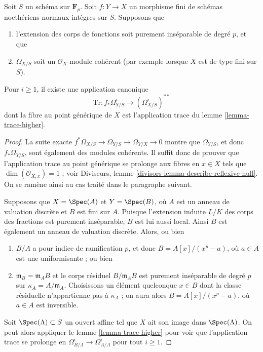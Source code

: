 \begin{lemma} \label{lemma-trace-extends} Soit $S$ un schéma sur $\mathbf{F}_p$. Soit $f : Y \to X$ un morphisme fini de schémas noethériens normaux intègres sur $S$. Supposons que \begin{enumerate} \item l'extension des corps de fonctions soit purement inséparable de degré $p$, et que \item $\Omega_{X/S}$ soit un $\mathcal{O}_X$-module cohérent (par exemple lorsque $X$ est de type fini sur $S$). \end{enumerate} Pour $i \geq 1$, il existe une application canonique $$
\text{Tr} : f_*\Omega^i_{Y/S} \longrightarrow (\Omega_{X/S}^i)^{**}
$$ dont la fibre au point générique de $X$ est l'application trace du lemme \ref{lemma-trace-higher}. \end{lemma}

\begin{proof} La suite exacte $f^*\Omega_{X/S} \to \Omega_{Y/S} \to \Omega_{Y/X} \to 0$ montre que $\Omega_{Y/S}$, et donc $f_*\Omega_{Y/S}$, sont également des modules cohérents. Il suffit donc de prouver que l'application trace au point générique se prolonge aux fibres en $x \in X$ tels que $\dim(\mathcal{O}_{X, x}) = 1$ ; voir Diviseurs, lemme \ref{divisors-lemma-describe-reflexive-hull}. On se ramène ainsi au cas traité dans le paragraphe suivant.

\medskip\noindent Supposons que $X = \Spec(A)$ et $Y = \Spec(B)$, où $A$ est un anneau de valuation discrète et $B$ est fini sur $A$. Puisque l'extension induite $L/K$ des corps des fractions est purement inséparable, $B$ est lui aussi local. Ainsi $B$ est également un anneau de valuation discrète. Alors, ou bien \begin{enumerate} \item $B/A$ a pour indice de ramification $p$, et donc $B = A[x]/(x^p - a)$, où $a \in A$ est une uniformisante ; ou bien \item $\mathfrak m_B = \mathfrak m_A B$ et le corps résiduel $B/\mathfrak m_A B$ est purement inséparable de degré $p$ sur $\kappa_A = A/\mathfrak m_A$. Choisissons un élément quelconque $x \in B$ dont la classe résiduelle n'appartienne pas à $\kappa_A$ ; on aura alors $B = A[x]/(x^p - a)$, où $a \in A$ est inversible. \end{enumerate} Soit $\Spec(\Lambda) \subset S$ un ouvert affine tel que $X$ ait son image dans $\Spec(\Lambda)$. On peut alors appliquer le lemme \ref{lemma-trace-higher} pour voir que l'application trace se prolonge en $\Omega^i_{B/\Lambda} \to \Omega^i_{A/\Lambda}$ pour tout $i \geq 1$. \end{proof}


















